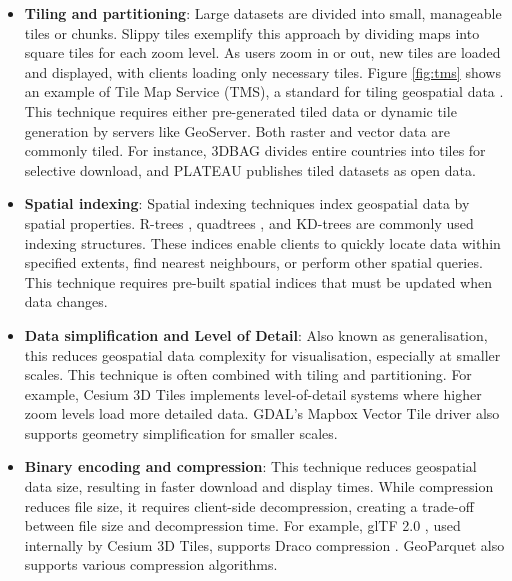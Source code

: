 \begin{itemize}
  \item \textbf{Tiling and partitioning}: Large datasets are divided into small, manageable tiles or chunks. Slippy tiles exemplify this approach by dividing maps into square tiles for each zoom level. As users zoom in or out, new tiles are loaded and displayed, with clients loading only necessary tiles. Figure \ref{fig:tms} shows an example of Tile Map Service (TMS), a standard for tiling geospatial data \citep{tms}. This technique requires either pre-generated tiled data or dynamic tile generation by servers like GeoServer. Both raster and vector data are commonly tiled. For instance, 3DBAG divides entire countries into tiles for selective download, and PLATEAU publishes tiled datasets as open data.

  \item \textbf{Spatial indexing}: Spatial indexing techniques index geospatial data by spatial properties. R-trees \citep{guttman_1984}, quadtrees \citep{finkel_1974}, and KD-trees \citep{bentley_1975} are commonly used indexing structures. These indices enable clients to quickly locate data within specified extents, find nearest neighbours, or perform other spatial queries. This technique requires pre-built spatial indices that must be updated when data changes.

  \item \textbf{Data simplification and Level of Detail}: Also known as generalisation, this reduces geospatial data complexity for visualisation, especially at smaller scales. This technique is often combined with tiling and partitioning. For example, Cesium 3D Tiles \citep{3d_tiles} implements level-of-detail systems where higher zoom levels load more detailed data. GDAL's Mapbox Vector Tile driver also supports geometry simplification for smaller scales.

  \item \textbf{Binary encoding and compression}: This technique reduces geospatial data size, resulting in faster download and display times. While compression reduces file size, it requires client-side decompression, creating a trade-off between file size and decompression time. For example, glTF 2.0 \citep{gltf_2_0}, used internally by Cesium 3D Tiles, supports Draco compression \citep{draco}. GeoParquet \citep{geoparquet} also supports various compression algorithms.
\end{itemize}

